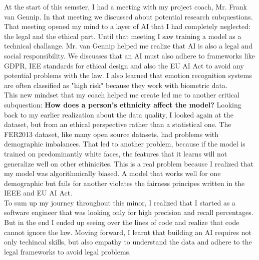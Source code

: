 \documentclass[12pt,a4paper]{article}
\begin{document}
At the start of this semster, I had a meeting with my project coach, Mr. Frank van Gennip. In that meeting we discussed about potential research subquestions. That meeting opened my mind to a layer of AI that I had completely neglected: the legal and the ethical part. Until that meeting I saw training a model as a technical challange. Mr. van Gennip helped me realize that AI is also a legal and social responsibility. We discusses that an AI must also adhere to frameworks like GDPR, IEE standards for ethical design and also the EU AI Act to avoid any potential problems with the law. I also learned that emotion recognition systems are often classified as "high risk" because they work with biometric data.\\
This new mindset that my coach helped me create led me to another critical subquestion: \textbf{How does a person's ethnicity affect the model?} Looking back to my earlier realization about the data quality, I looked again at the dataset, but from an ethical perspective rather than a statistical one. The FER2013 dataset, like many open source datasets, had problems with demographic imbalances. That led to another problem, because if the model is trained on predominantly white faces, the features that it learns will not generalize well on other ethinicites. This is a real problem because I realized that my model was algorithmically biased. A model that works well for one demographic but fails for another violates the fairness principes written in the IEEE and EU AI Act.\\
To sum up my journey throughout this minor, I realized that I started as a software engineer that was looking only for high precision and recall percentages. But in the end I ended up seeing over the lines of code and realize that code cannot ignore the law. Moving forward, I learnt that building an AI requires not only techincal skills, but also empathy to understand the data and adhere to the legal frameworks to avoid legal problems.

\newpage
\printbibliography
\end{document}
